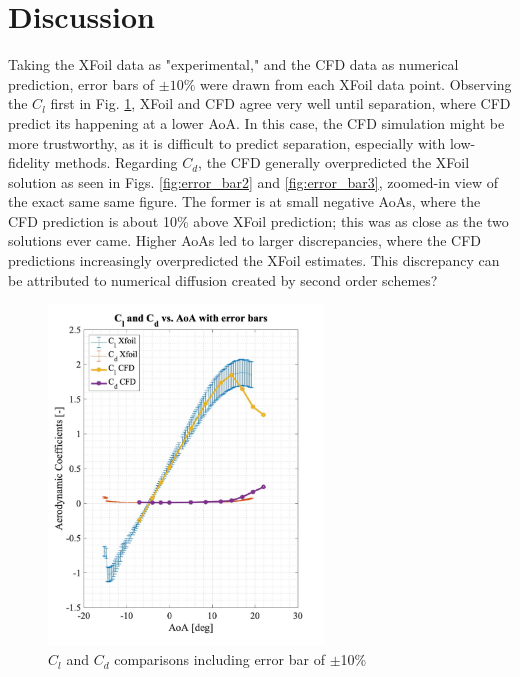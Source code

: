 \section{Discussion}

Taking the XFoil data as "experimental," and the CFD data as numerical prediction, error bars of $\pm10\%$ were drawn from each XFoil data point. Observing the $C_l$ first in Fig. \ref{fig:error_bar1}, XFoil and CFD agree very well until separation, where CFD predict its happening at a lower AoA. In this case, the CFD simulation might be more trustworthy, as it is difficult to predict separation, especially with low-fidelity methods. Regarding $C_d$, the CFD generally overpredicted the XFoil solution as seen in Figs. \ref{fig:error_bar2} and \ref{fig:error_bar3}, zoomed-in view of the exact same same figure. The former is at small negative AoAs, where the CFD prediction is about 10\% above XFoil prediction; this was as close as the two solutions ever came. Higher AoAs led to larger discrepancies, where the CFD predictions increasingly overpredicted the XFoil estimates. This discrepancy can be attributed to numerical diffusion created by second order schemes?

\begin{figure}[H]
\centering
    \includegraphics[width=0.65\textwidth]{error_bar1.jpg}
    \caption{$C_l$ and $C_d$ comparisons including error bar of $\pm$10\%}
    \label{fig:error_bar1}
\end{figure}

